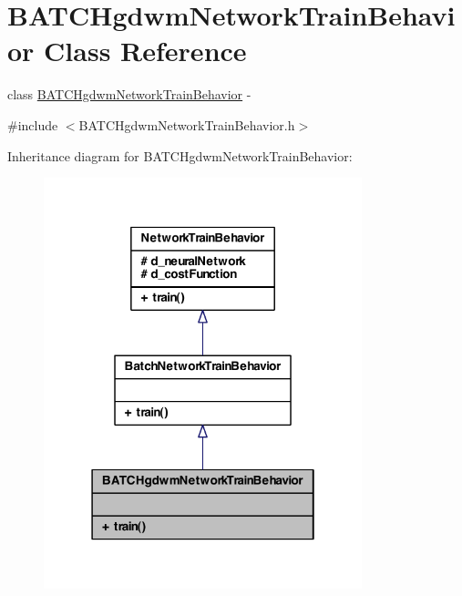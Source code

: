 \hypertarget{class_b_a_t_c_hgdwm_network_train_behavior}{
\section{BATCHgdwmNetworkTrainBehavior Class Reference}
\label{class_b_a_t_c_hgdwm_network_train_behavior}
}


class \hyperlink{class_b_a_t_c_hgdwm_network_train_behavior}{BATCHgdwmNetworkTrainBehavior} -\/  




{\ttfamily \#include $<$BATCHgdwmNetworkTrainBehavior.h$>$}



Inheritance diagram for BATCHgdwmNetworkTrainBehavior:
\nopagebreak
\begin{figure}[H]
\begin{center}
\leavevmode
\includegraphics[width=262pt]{class_b_a_t_c_hgdwm_network_train_behavior__inherit__graph}
\end{center}
\end{figure}


